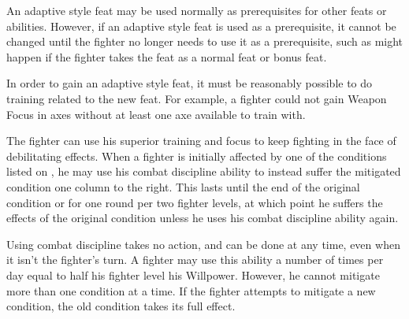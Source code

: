 \par An adaptive style feat may be used normally as prerequisites for other feats or abilities.
However, if an adaptive style feat is used as a prerequisite, it cannot be changed until the fighter no longer needs to use it as a prerequisite, such as might happen if the fighter takes the feat as a normal feat or bonus feat.

\par In order to gain an adaptive style feat, it must be reasonably possible to do training related to the new feat.
For example, a fighter could not gain Weapon Focus in axes without at least one axe available to train with.

The fighter can use his superior training and focus to keep fighting in the face of debilitating effects.
When a fighter is initially affected by one of the conditions listed on , he may use his combat discipline ability to instead suffer the mitigated condition one column to the right.
This lasts until the end of the original condition or for one round per two fighter levels, at which point he suffers the effects of the original condition unless he uses his combat discipline ability again.
\par Using combat discipline takes no action, and can be done at any time, even when it isn't the fighter's turn.
A fighter may use this ability a number of times per day equal to half his fighter level \add his Willpower.
However, he cannot mitigate more than one condition at a time.
If the fighter attempts to mitigate a new condition, the old condition takes its full effect.

